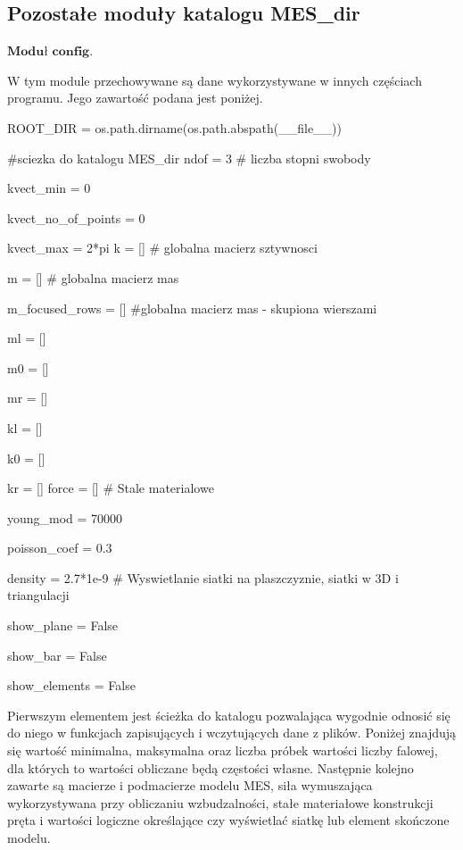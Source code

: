 
\subsection{Pozostałe moduły katalogu MES\_dir}
\label{cha:pozostale_moduly}

 \( \textbf{Moduł config} \).

W tym module przechowywane są dane wykorzystywane w innych częściach programu. Jego zawartość podana jest poniżej.

\vspace {3mm}
ROOT\_DIR = os.path.dirname(os.path.abspath(\_\_file\_\_))

\#sciezka do katalogu MES\_dir
\vspace {3mm}
ndof = 3    \# liczba stopni swobody

kvect\_min = 0

kvect\_no\_of\_points = 0

kvect\_max = 2*pi
\vspace {3mm}
k = []  \# globalna macierz sztywnosci

m = []  \# globalna macierz mas

m\_focused\_rows = [] \#globalna macierz mas - skupiona wierszami

ml = []

m0 = []

mr = []

kl = []

k0 = []

kr = []
\vspace {3mm}
force = []
\vspace {3mm}
\# Stale materialowe

young\_mod = 70000

poisson\_coef = 0.3

density = 2.7*1e-9
\vspace {3mm}
\# Wyswietlanie siatki na plaszczyznie, siatki w 3D i triangulacji

show\_plane = False

show\_bar = False

show\_elements = False
\vspace {3mm}

Pierwszym elementem jest ścieżka do katalogu pozwalająca wygodnie odnosić się do niego w funkcjach zapisujących i wczytujących dane z plików. Poniżej znajdują się wartość minimalna, maksymalna oraz liczba próbek wartości liczby falowej, dla których to wartości obliczane będą częstości własne. Następnie kolejno zawarte są macierze i podmacierze modelu MES, siła wymuszająca wykorzystywana przy obliczaniu wzbudzalności, stałe materiałowe konstrukcji pręta i wartości logiczne określające czy wyświetlać siatkę lub element skończone modelu.

\vspace {3mm}

